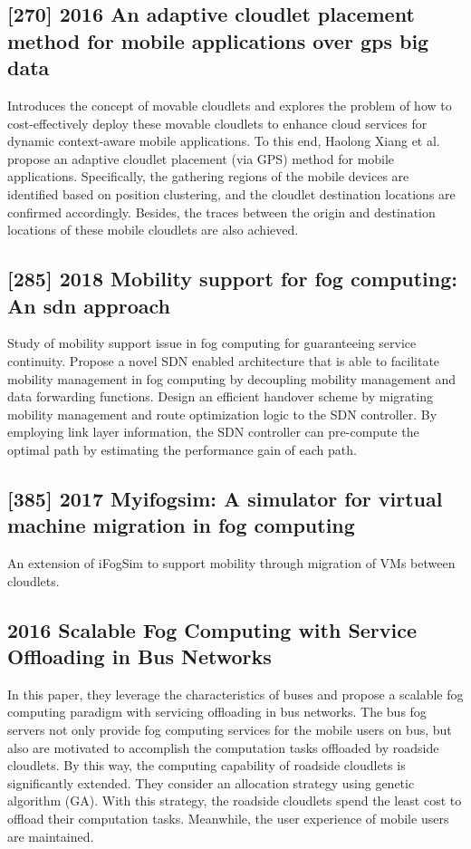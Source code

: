 \subsection{[270] 2016 An adaptive cloudlet placement method for mobile applications over gps big data}
\label{subsec:paper19}
Introduces the concept of movable cloudlets and explores the problem of how to cost-effectively deploy these movable cloudlets to enhance cloud services for dynamic context-aware mobile applications. To this end, Haolong Xiang et al. \cite{xiang2016adaptive} propose an adaptive cloudlet placement (via GPS) method for mobile applications. Specifically, the gathering regions of the mobile devices are identified based on position clustering, and the cloudlet destination locations are confirmed accordingly. Besides, the traces between the origin and destination locations of these mobile cloudlets are also achieved.

\subsection{[285] 2018 Mobility support for fog computing: An sdn approach}
\label{subsec:paper20} \cite{bi2018mobility}
Study of mobility support issue in fog computing for guaranteeing service continuity. Propose a novel SDN enabled architecture that is able to facilitate mobility management in fog computing by decoupling mobility management and data forwarding functions. Design an efficient handover scheme by migrating mobility management and route optimization logic to the SDN controller. By employing link layer information, the SDN controller can pre-compute the optimal path by estimating the performance gain of each path.

\subsection{[385] 2017 Myifogsim: A simulator for virtual machine migration in fog computing}
\label{subsec:paper21} \cite{lopes2017myifogsim}
An extension of iFogSim to support mobility through migration of VMs between cloudlets.

\subsection{2016 Scalable Fog Computing with Service Offloading in Bus Networks}
\label{subsec:paper22} \cite{ye2016scalable}
In this paper, they leverage the characteristics of buses and propose a scalable fog computing paradigm with servicing offloading in bus networks. The bus fog servers not only provide fog computing services for the mobile users on bus, but also are motivated to accomplish the computation tasks offloaded by roadside cloudlets. By this way, the computing capability of roadside cloudlets is significantly extended. They consider an allocation strategy using genetic algorithm (GA). With this strategy, the roadside cloudlets spend the least cost to offload their computation tasks. Meanwhile, the user experience of mobile users are maintained.

